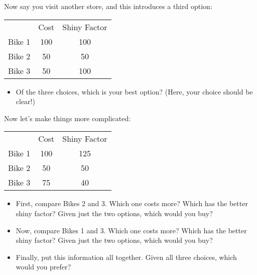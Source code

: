 Now say you visit another store, and this introduces a third option:


        \begin{table}[H]
        \centering
        \begin{tabular}{lcc}
        	& Cost	& Shiny Factor	\\ \cline{2-3} 
        \multicolumn{1}{r|}{Bike 1} & \multicolumn{1}{c|}{100}  & \multicolumn{1}{c|}{100} \\ \cline{2-3} 
        \multicolumn{1}{r|}{Bike 2} & \multicolumn{1}{c|}{50} & \multicolumn{1}{c|}{50}  \\ \cline{2-3} 
        \multicolumn{1}{l|}{Bike 3} & \multicolumn{1}{c|}{50}  & \multicolumn{1}{c|}{100} \\ \cline{2-3} 
        \end{tabular}
        \end{table}


\begin{itemize}
\item Of the three choices, which is your best option? (Here, your choice should be clear!)
\end{itemize}


Now let’s make things more complicated:


        \begin{table}[H]
        \centering
        \begin{tabular}{lcc}
        	& Cost	& Shiny Factor	\\ \cline{2-3} 
        \multicolumn{1}{r|}{Bike 1} & \multicolumn{1}{c|}{100}  & \multicolumn{1}{c|}{125} \\ \cline{2-3} 
        \multicolumn{1}{r|}{Bike 2} & \multicolumn{1}{c|}{50} & \multicolumn{1}{c|}{50}  \\ \cline{2-3} 
        \multicolumn{1}{l|}{Bike 3} & \multicolumn{1}{c|}{75}  & \multicolumn{1}{c|}{40} \\ \cline{2-3} 
        \end{tabular}
        \end{table}


\begin{itemize}
\item First, compare Bikes 2 and 3. Which one costs more? Which has the better shiny factor? Given just the two options, which would you buy?
\item Now, compare Bikes 1 and 3. Which one costs more? Which has the better shiny factor? Given just the two options, which would you buy?
\item Finally, put this information all together. Given all three choices, which would you prefer?
\end{itemize}


